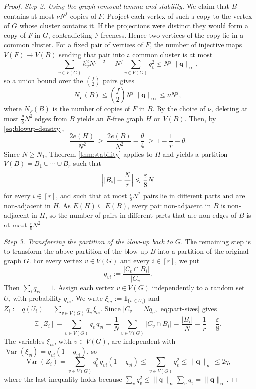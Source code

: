 \documentclass[11pt, a4paper]{article}
\theoremstyle{definition}
\theoremstyle{plain}
\renewcommand{\le}{\leqslant}
\renewcommand{\ge}{\geqslant}
\newcommand{\EE}{\mathbb{E}}
\newcommand{\Var}{\operatorname{Var}}
\begin{document}
\begin{proof}
\noindent
\textit{Step 2. Using the graph removal lemma and stability.} 
We claim that $B$ contains at most $\nu N^f$  
copies of $F$. Project each vertex of such a copy to
the vertex of $G$ whose cluster contains it. If the
projections were distinct they would form a copy of
$F$ in $G$, contradicting $F$-freeness. Hence two
vertices of the copy lie in a common cluster. For a
fixed pair of vertices of $F$, the number of injective
maps $V(F)\to V(B)$ sending that pair into a common
cluster is at most
\[
  \sum_{v\in V(G)}k_v^2N^{f-2}
  =N^f\sum_{v\in V(G)}q_v^2
  \le N^f\lVert\bm q\rVert_\infty ,
\]
so a union bound over the $\binom f2$ pairs gives
\[
  N_F(B)\le\binom f2N^f\lVert\bm q\rVert_\infty
  \le\nu N^f,
\]
where $N_F(B)$ is the number of copies of $F$
in $B$. By the choice of $\nu$, deleting at most
$\frac{\theta}{8}N^2$ edges from $B$ yields an
$F$-free graph $H$ on $V(B)$.  Then, by
\eqref{eq:blowup-density},
\[
  \frac{2e(H)}{N^2}\ \ge\ \frac{2e(B)}{N^2}
  -\frac{\theta}{4}
  \ \ge\ 1-\frac1r-\theta .
\]
Since $N\ge N_1$, Theorem \ref{thm:stability} applies
to $H$ and yields a partition
$V(B)=B_1\cup\cdots\cup B_r$ such that 
\begin{equation}\label{eq:part-sizes}
  \Bigl\lvert|B_i|-\frac Nr\Bigr\rvert
  \le\frac{\varepsilon}{8}N
\end{equation}
for every $i\in [r]$, and such that at most $\frac{\varepsilon}{8}N^2$ pairs lie
in different parts and are non-adjacent in $H$. As
$E(H)\subseteq E(B)$, every pair non-adjacent in $B$
is non-adjacent in $H$, so
the number of pairs in different parts that are
  non-edges of $B$ is at most $\frac{\varepsilon}{8}N^2$.

\smallskip 
\noindent
\textit{Step 3. Transferring the partition of the blow-up back to $G$.}
The remaining step is to transform the above partition of the blow-up $B$ into a partition of the original graph $G$.  
For every vertex $v\in V(G)$ and every $i\in[r]$, 
we put  
$$q_{vi}:= \frac{| C_v\cap B_i|}{| C_v|}. $$
Then $\sum_{i}q_{vi}=1$. 
Assign each vertex 
$v\in V(G)$
independently to a random set $U_i$ with probability $q_{vi}$. 
We write $\xi_{vi}:=\mathbf 1_{\{v\in U_i\}}$ 
and $Z_i:=q(U_i)=\sum_{v\in V(G)}q_v\,\xi_{vi}$. Since
$\lvert C_v\rvert=Nq_v$, \eqref{eq:part-sizes} gives
\begin{equation}\label{eq:Zi-expectation}
  \EE[Z_i]=\sum_{v\in V(G)}q_v \, q_{vi}
  =\frac1N\sum_{v\in V(G)}\lvert C_v\cap B_i\rvert
  =\frac{|B_i|}{N}
  =\frac1r\pm\frac{\varepsilon}{8}.
\end{equation}
The variables $\xi_{vi}$, with $v\in V(G)$, are independent
with $\Var(\xi_{vi})=q_{vi}(1-q_{vi})$, so
\begin{equation}\label{eq:Zi-variance}
  \Var(Z_i)=\sum_{v\in V(G)}q_v^2 \, 
  q_{vi}(1-q_{vi})
  \le\sum_{v\in V(G)}q_v^2
  \le\lVert\bm q\rVert_\infty\le2\eta ,
\end{equation}
where the last inequality holds because
$\sum_vq_v^2\le \lVert\bm q\rVert_\infty 
\sum_v q_v = \lVert\bm q\rVert_\infty $.


\end{proof}
\end{document}
